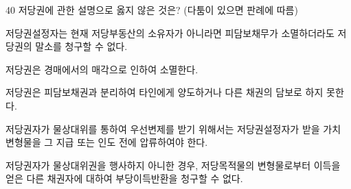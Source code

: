\begin{question}{40}
저당권에 관한 설명으로 옳지 않은 것은? (다툼이 있으면 판례에 따름)
\begin{choices}
  \item 저당권설정자는 현재 저당부동산의 소유자가 아니라면 피담보채무가 소멸하더라도 저당권의 말소를 청구할 수 없다.
  \item 저당권은 경매에서의 매각으로 인하여 소멸한다.
  \item 저당권은 피담보채권과 분리하여 타인에게 양도하거나 다른 채권의 담보로 하지 못한다.
  \item 저당권자가 물상대위를 통하여 우선변제를 받기 위해서는 저당권설정자가 받을 가치 변형물을 그 지급 또는 인도 전에 압류하여야 한다.
  \item 저당권자가 물상대위권을 행사하지 아니한 경우, 저당목적물의 변형물로부터 이득을 얻은 다른 채권자에 대하여 부당이득반환을 청구할 수 없다.
\end{choices}
\end{question}
